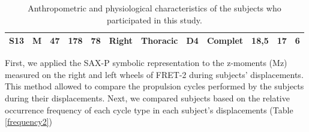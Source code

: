 \begin{landscape}
\begin{table}[h]
\begin{tabular}{|c|c|c|c|c|c|c|c|c|c|c|c|}
S13                                                    & M                                   & 47                                & 178                                       & 78                                        & Right                                                                                    & Thoracic                                                                                 & D4                                                                                         & Complet                                                                                     & 18,5                                                                                            & 17                                                                                         & 6                                                                                          \\ \hline
\end{tabular}
\caption{Anthropometric and physiological characteristics of the subjects who participated in this study.}
\label{physio}
\end{table}

\end{landscape}


First, we applied the SAX-P symbolic representation to the z-moments (Mz) measured on the right and left wheels of FRET-2 during subjects' displacements. This method allowed to compare the propulsion cycles performed by the subjects during their displacements. Next, we compared subjects based on the relative occurrence frequency of each cycle type in each subject's displacements (Table \ref{frequency2})

